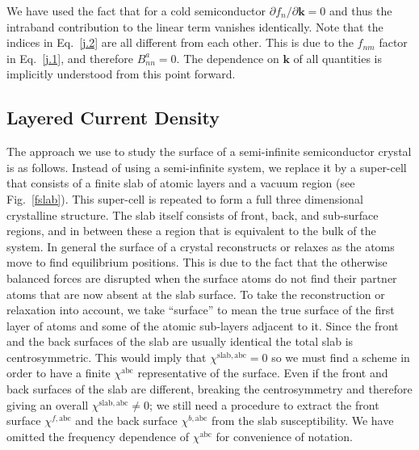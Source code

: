 \documentclass[floatfix,prb,aps,superscriptaddress,showpacs,11pt,preprint,letterpaper]{revtex4}
\begin{document}
We have used the fact that for a cold semiconductor $\partial
f_{n}/\partial \mathbf{k}=0$ and thus the intraband contribution to the linear
term vanishes identically. 
Note that the indices in Eq.~\eqref{j.2} are all different from each
other. This is due to the $f_{nm}$ factor in Eq.~\eqref{j.1}, 
and therefore $B^a_{nn}=0$. The dependence on $\mathbf{k}$ 
of all quantities is implicitly understood from 
this point forward.

\subsection{Layered Current Density}\label{cd}

The approach we use to study the surface of a semi-infinite
semiconductor crystal is as follows. Instead of using a
semi-infinite system, we replace it by a super-cell that 
consists of a finite
slab of atomic layers and a vacuum region (see Fig.~\ref{fslab}). This
super-cell
is repeated to form a full three dimensional crystalline structure.
The slab itself consists of front, back, and 
sub-surface regions, and in between these
a region that is equivalent to the
bulk of the system. 
In general the surface of a crystal reconstructs or relaxes as the atoms
move to find equilibrium positions. This is due to the fact that
the otherwise
balanced forces are disrupted when the surface atoms do not find their 
partner atoms that are now absent at the slab surface.
To take the reconstruction or relaxation into account, 
we take ``surface'' to mean
the true surface of the first layer of atoms and
some of the atomic sub-layers adjacent to it.
Since the front and the back
surfaces of the slab are usually identical the total slab is
centrosymmetric. This would imply that 
$\chi^{\mathrm{slab},\mathrm{a}\mathrm{b}\mathrm{c}}=0$ so we must
find a scheme 
in order to have a finite $\chi^{\mathrm{a}\mathrm{b}\mathrm{c}}$ representative of the
surface. Even if the front and back surfaces of the slab 
are different, breaking the centrosymmetry and therefore giving an
overall $\chi^{\mathrm{slab},\mathrm{a}\mathrm{b}\mathrm{c}}\ne 0$; we still
need a procedure to extract the front surface $\chi^{f,\mathrm{a}\mathrm{b}\mathrm{c}}$
and the back surface $\chi^{b,\mathrm{a}\mathrm{b}\mathrm{c}}$ from the slab
susceptibility. 
We have omitted the frequency dependence of $\chi^{\mathrm{a}\mathrm{b}\mathrm{c}}$ for 
convenience of notation.
\end{document}
